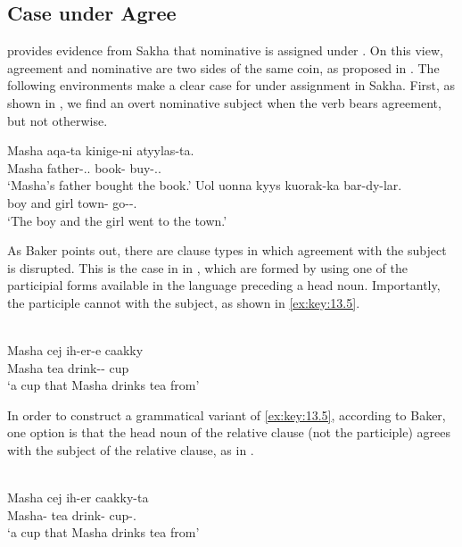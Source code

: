 \documentclass[output=paper]{langsci/langscibook}
\begin{document}
\subsection{Case under Agree}\label{sec:key:13.2.1}

\textcite[29f.]{Baker2015} provides evidence from Sakha that
nominative is assigned under . On this view,
agreement and nominative are two sides of the same coin, as
proposed in \citet{Chomsky2001}. The following environments make a clear case
for \Nom{} under  assignment in Sakha. First, as shown in
, we find an overt nominative subject when
the verb bears agreement, but not otherwise.

\ea%
    \label{ex:key:13.4}  \parencite[29]{Baker2015}
	\ea
	\gll  Masha aqa-ta kinige-ni atyylas-ta.\\
	    Masha father-\Tsg.\Poss{}.\Nom{}  book-\Acc{}  buy-\Pst{}.\Tsg.\Sbj{}\\
	\glt     ‘Masha’s father bought the book.’
	\ex
	\gll  Uol uonna kyys kuorak-ka bar-dy-lar.\\
        boy and girl town-\Dat{}  go-\Pst{}-\Tpl.\Sbj{}\\
	\glt     ‘The boy and the girl went to the town.’
    \z
\z

As Baker points out, there are clause types in which agreement with the
subject
is disrupted. This is the case in  in , which are formed
by using one of the participial forms available in the language preceding a
head noun. Importantly, the participle cannot  with the subject, as shown
in \eqref{ex:key:13.5}.

\ea%
    \label{ex:key:13.5} \parencite[30]{Baker2015}\\
    \gll \llap{*}Masha cej ih-er-e caakky\\
        Masha tea drink-\Aor{}-\Tsg{} cup\\
    \glt ‘a cup that Masha drinks tea from’
\z

In order to construct a grammatical variant of \eqref{ex:key:13.5}, according to
Baker, one option is that the head noun of the relative clause (not the
participle) agrees with the subject of the relative clause, as in
.

\ea%
    \label{ex:key:13.6} \parencite[30]{Baker2015}\\
    \gll  Masha cej ih-er caakky-ta\\
          Masha-\Gen{}  tea drink-\Aor{}  cup-\Tsg.\Poss{}\\
    \glt  ‘a cup that Masha drinks tea from’
\z
\end{document}
